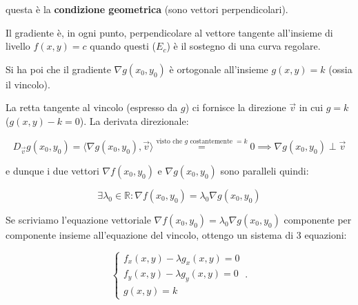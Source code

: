\documentclass[../appunti-analisi.tex]{subfiles}
\begin{document}
questa è la \textbf{condizione geometrica} (sono vettori perpendicolari).

Il gradiente è, in ogni punto, perpendicolare al vettore tangente all'insieme di livello $f(x,y) = c$ quando questi ($E_c$) è il sostegno di una curva regolare.

Si ha poi che il gradiente $\nabla g(x_0,y_0)$ è ortogonale all'insieme $g(x,y) = k$ (ossia il vincolo).


La retta tangente al vincolo (espresso da $g$) ci fornisce la direzione $\vec{v}$ in cui $g=k$ ($g(x,y) -k=0$). La derivata direzionale:

\[
    D_{\vec{v}} g(x_0,y_0) = \langle \nabla g(x_0,y_0), \vec{v} \rangle \overset{\text{visto che $g$ costantemente $=k$}}{=} 0 \implies \nabla g(x_0,y_0) \perp \vec{v}
\]

e dunque i due vettori $\nabla f(x_0,y_0)$ e $\nabla g(x_0,y_0)$ sono paralleli quindi:

\[
\exists \lambda_0 \in \mathbb{R}: \nabla f(x_0,y_0) = \lambda_0 \nabla g(x_0,y_0)
\]



Se scriviamo l'equazione vettoriale $\nabla f(x_0,y_0) = \lambda_0 \nabla g(x_0,y_0)$ componente per componente insieme all'equazione del vincolo, ottengo un sistema di 3 equazioni:

\begin{equation}\label{eq:lagrangiana}
    \begin{cases}
           f_x(x,y) - \lambda g_x(x,y) = 0\\
           f_y(x,y) - \lambda g_y(x,y) = 0\\
           g(x,y) =k
    \end{cases}\,.
\end{equation}
\end{document}
